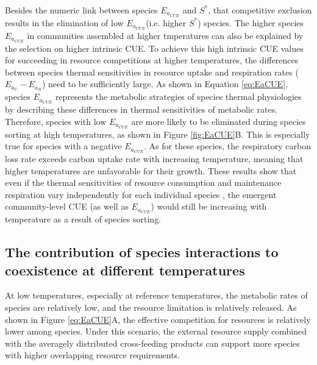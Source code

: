 \documentclass[11pt, a4paper]{article}
\begin{document}
\begin{spacing}{1.5}
Besides the numeric link between species $E_{a_{CUE}}$ and $S^*$, that competitive exclusion results in the elimination of low $E_{a_{CUE}}$(i.e. higher $S^*$) species. The higher species $E_{a_{CUE}}$ in communities assembled at higher tmperatures can also be explained by the selection on higher intrinsic CUE. To achieve this high intrinsic CUE values for succeeding in resource competitions at higher temperatures, the differences between species thermal sensitivities in resource uptake and respiration rates ($E_{a_U} - E_{a_R}$) need to be sufficiently large. As shown in Equation \ref{eq:EaCUE}, species $E_{a_{CUE}}$ represents the metabolic strategies of species thermal physiologies by describing these differences in thermal sensitivities of metabolic rates. Therefore, species with low $E_{a_{CUE}}$ are more likely to be eliminated during species sorting at high temperatures, as shown in Figure \ref{fig:EaCUE}B. This is especially true for species with a negative $E_{a_{CUE}}$. As for these species, the respiratory carbon loss rate exceeds carbon uptake rate with increasing temperature, meaning that higher temperatures are unfavorable for their growth. These results show that even if the thermal sensitivities of resource consumption and maintenance respiration vary independently for each individual species \citep{pold2020carbon}, the emergent community-level CUE (as well as $E_{a_{CUE}}$) would still be increasing with temperature as a result of species sorting.

\subsection{The contribution of species interactions to coexistence at different temperatures}

At low temperatures, especially at reference temperatures, the metabolic rates of species are relatively low, and the resource limitation is relatively released. As shown in Figure \ref{eq:EaCUE}A, the effective competition for resources is relatively lower among species. Under this scenario, the external resource supply combined with the averagely distributed cross-feeding products can support more species with higher overlapping resource requirements. 


\end{spacing}
\end{document}
